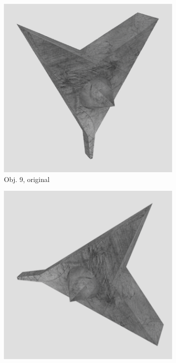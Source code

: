 \begin{figure}
\medskip
\begin{subfigure}{0.2\textwidth}
\includegraphics[width=\linewidth]{Bilder/Objekt9A.png}
\caption{Obj. 9, original} \label{fig:c}
\end{subfigure}\hspace{.5cm} %
\begin{subfigure}{0.2\textwidth}
\includegraphics[width=\linewidth]{Bilder/Objekt9B.png}

\end{subfigure}
\end{figure}
